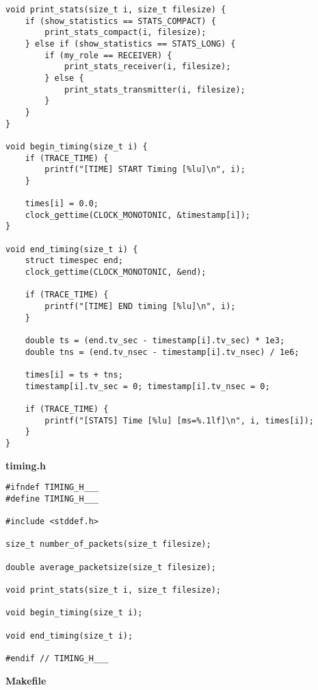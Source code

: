 \documentclass[subfiles]{main.tex}
\begin{document}
\begin{lstlisting}[style=rcom]
void print_stats(size_t i, size_t filesize) {
	if (show_statistics == STATS_COMPACT) {
		print_stats_compact(i, filesize);
	} else if (show_statistics == STATS_LONG) {
		if (my_role == RECEIVER) {
			print_stats_receiver(i, filesize);
		} else {
			print_stats_transmitter(i, filesize);
		}
	}
}

void begin_timing(size_t i) {    
	if (TRACE_TIME) {
		printf("[TIME] START Timing [%lu]\n", i);
	}
	
	times[i] = 0.0;
	clock_gettime(CLOCK_MONOTONIC, &timestamp[i]);
}

void end_timing(size_t i) {
	struct timespec end;
	clock_gettime(CLOCK_MONOTONIC, &end);
	
	if (TRACE_TIME) {
		printf("[TIME] END timing [%lu]\n", i);
	}
	
	double ts = (end.tv_sec - timestamp[i].tv_sec) * 1e3;
	double tns = (end.tv_nsec - timestamp[i].tv_nsec) / 1e6;
	
	times[i] = ts + tns;
	timestamp[i].tv_sec = 0; timestamp[i].tv_nsec = 0;
	
	if (TRACE_TIME) {
		printf("[STATS] Time [%lu] [ms=%.1lf]\n", i, times[i]);
	}
}
\end{lstlisting}

{\Large\textbf{timing.h}}

\begin{lstlisting}[style=rcom]
#ifndef TIMING_H___
#define TIMING_H___

#include <stddef.h>

size_t number_of_packets(size_t filesize);

double average_packetsize(size_t filesize);

void print_stats(size_t i, size_t filesize);

void begin_timing(size_t i);

void end_timing(size_t i);

#endif // TIMING_H___
\end{lstlisting}

{\Large\textbf{Makefile}}
\end{document}
